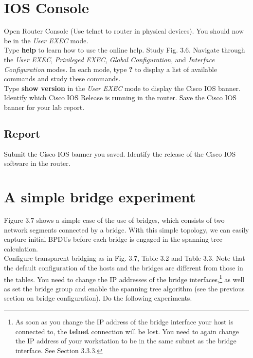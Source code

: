 \documentclass[10pt,a4paper]{article}
\numberwithin{equation}{section}
\numberwithin{figure}{section}
\numberwithin{table}{section}
\begin{document}
\section{IOS Console}
    Open Router Console (Use telnet to router in physical devices).
    You should now be in the \textit{User EXEC} mode. \\
    Type \textbf{help} to learn how to use the online help.
    Study Fig. 3.6. Navigate through the \textit{User EXEC}, \textit{Privileged EXEC}, \textit{Global Configuration}, and \textit{Interface Configuration} modes. In each mode, type \textbf{?} to display a list of available commands and study these commands. \\
    Type \textbf{show version} in the \textit{User EXEC} mode to display the Cisco IOS banner.
    Identify which Cisco IOS Release is running in the router.
    Save the Cisco IOS banner for your lab report.
    \subsection*{Report}
    Submit the Cisco IOS banner you saved.
    Identify the release of the Cisco IOS software in the router.

\section*{A simple bridge experiment}
    Figure 3.7 shows a simple case of the use of bridges, which consists of two network segments connected by a bridge.
    With this simple topology, we can easily capture initial BPDUs before each bridge is engaged in the spanning tree calculation. \\
    Configure transparent bridging as in Fig.
    3.7, Table 3.2 and Table 3.3.
    Note that the default configuration of the hosts and the bridges are different from those in the tables.
    You need to change the IP addresses of the bridge interfaces,\footnote{As soon as you change the IP address of the bridge interface your host is connected to, the \textbf{telnet} connection will be lost.
    You need to again change the IP address of your workstation to be in the same subnet as the bridge interface. See Section 3.3.3.} as well as set the bridge group and enable the spanning tree algorithm (see the previous section on bridge configuration).
    Do the following experiments.
\end{document}
